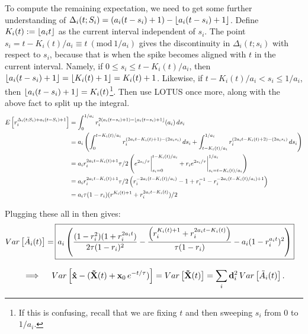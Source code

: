To compute the remaining expectation, we need to get some further understanding of $\Delta_i(t; S_i) = (a_i(t - s_i) + 1) - \lfloor {a_i(t - s_i) + 1} \rfloor$. Define $K_i(t) := \lfloor {a_i t} \rfloor$ as the current interval independent of $s_i$. %
The point \mbox{$s_i = t - K_i(t)/a_i \equiv t \ (\text{mod}\ 1/a_i)$} gives the discontinuity in $\Delta_i(t; s_i)$ with respect to $s_i$, because that is when the spike becomes aligned with $t$ in the current interval. Namely, if $0 \le s_i \le t - K_i(t)/a_i$, then $\lfloor {a_i(t - s_i) + 1} \rfloor = \lfloor {K_i(t) + 1} \rfloor = K_i(t) + 1$. Likewise, if $t - K_i(t)/a_i < s_i \le 1/a_i$, then $\lfloor {a_i(t - s_i) + 1} \rfloor = K_i(t)$\footnote{If this is confusing, recall that we are fixing $t$ and then sweeping $s_i$ from $0$ to $1 / a_i$.}. Then use LOTUS once more, along with the above fact to split up the integral.
\begin{align*}
E \left[ r_i^{\Delta_i(t; S_i) + a_i(t - S_i) + 1} \right] &= \int_0^{1/a_i} r_i^{2(a_i(t - s_i) + 1) - \lfloor {a_i(t - s_i) + 1} \rfloor} (a_i) \, ds_i \\
&= a_i \left( \int_0^{t - K_i(t)/a_i} r_i ^ {(2a_i t - K_i(t) + 1) - (2a_i s_i)} \, ds_i + \int_{t - K_i(t)/a_i}^{1/a_i} r_i^{(2a_i t - K_i(t) + 2) - (2a_i s_i)} \, ds_i \right) \\
&= a_i r_i^{2a_i t - K_i(t) + 1} \tau / 2 \left( e^{2s_i / \tau} \bigg|_{s_i=0}^{t - K_i(t)/a_i} + r_i e^{2s_i / \tau} \bigg|_{s_i=t - K_i(t)/a_i}^{1/a_i} \right) \\
&= a_i r_i^{2a_i t - K_i(t) + 1} \tau / 2 \left( r_i^{-2 a_i(t - K_i(t)/a_i)} - 1 + r_i^{-1} - r_i^{-2a_i(t - K_i(t)/a_i) + 1} \right) \\
&= a_i \tau (1 - r_i)(r^{K_i(t) + 1} + r_i^{2a_i t - K_i(t)}) / 2
\end{align*}

Plugging these all in then gives:
\begin{align*}
Var \left[ \tilde{A}_i(t) \right] = \, \Aboxed{ a_i \left( \frac{(1 - r_i^2)(1 + r_i^{2a_i t})}{2\tau(1 - r_i)^2} - \frac{\left( r_i^{K_i(t) + 1} + r_i^{2a_i t - K_i(t)} \right)}{\tau(1 - r_i)} - a_i(1 - r_i^{a_i t})^2 \right) }
\end{align*}

\begin{align}
\label{eq:variance}
\implies \quad Var\left[ \mathbf{\hat{x}} - (\mathbf{\tilde{X}}(t) + \mathbf{x}_0 \, e^{-t/\tau}) \right] = Var\left[ \mathbf{\tilde{X}}(t) \right]
= \sum_i \mathbf{d}_i^2 \, Var\left[ \tilde{A}_i(t) \right] .
\end{align}

